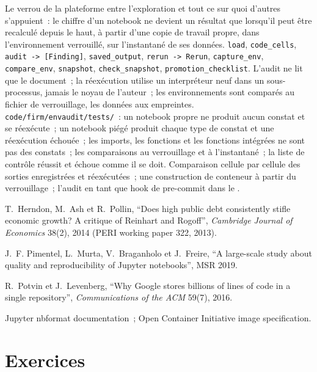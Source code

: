 \begin{build}
 Le verrou de la plateforme entre l'exploration et tout ce sur quoi d'autres s'appuient~: le chiffre d'un notebook ne devient un résultat que lorsqu'il peut
être recalculé depuis le haut, à partir d'une copie de travail propre, dans l'environnement verrouillé, sur l'instantané de ses données.
 \texttt{load}, \texttt{code\_cells}, \texttt{audit -> [Finding]}, \texttt{saved\_output}, \texttt{rerun -> Rerun},
\texttt{capture\_env}, \texttt{compare\_env}, \texttt{snapshot}, \texttt{check\_snapshot}, \texttt{promotion\_checklist}.
 L'audit ne lit que le document~; la réexécution utilise un interpréteur neuf dans un sous-processus, jamais le noyau de l'auteur~; les environnements
sont comparés au fichier de verrouillage, les données aux empreintes.
 \texttt{code/firm/envaudit/tests/}~: un notebook propre ne produit aucun constat et se réexécute~; un notebook piégé produit chaque type de
constat et une réexécution échouée~; les imports, les fonctions et les fonctions intégrées ne sont pas des constats~; les comparaisons au verrouillage et à l'instantané~; la liste de contrôle réussit et échoue
comme il se doit.
 Comparaison cellule par cellule des sorties enregistrées et réexécutées~; une construction de conteneur à partir du verrouillage~; l'audit en tant que hook de pre-commit dans le
.
\end{build}

\begin{omsources}
\item T.~Herndon, M.~Ash et R.~Pollin, ``Does high public debt consistently stifle economic growth? A critique of Reinhart and Rogoff'',
\emph{Cambridge Journal of Economics} 38(2), 2014 (PERI working paper 322, 2013).
\item J.~F. Pimentel, L.~Murta, V.~Braganholo et J.~Freire, ``A large-scale study about quality and reproducibility of Jupyter
notebooks'', MSR 2019.
\item R.~Potvin et J.~Levenberg, ``Why Google stores billions of lines of code in a single repository'', \emph{Communications of the ACM}
59(7), 2016.
\item Jupyter nbformat documentation~; Open Container Initiative image specification.
\end{omsources}

\section{Exercices}

